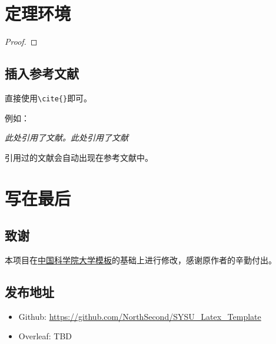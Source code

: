 \documentclass{SYSUReport}
\begin{document}
\section{定理环境}
\begin{Theorem}
\end{Theorem}

\begin{Lemma}
\end{Lemma}

\begin{Corollary}
\end{Corollary}

\begin{Proposition}
\end{Proposition}

\begin{Definition}
\end{Definition}

\begin{Example}
\end{Example}

\begin{proof}
\end{proof}

\subsection{插入参考文献}
直接使用\verb|\cite{}|即可。

例如：


\textit{ 此处引用了文献\cite{0Isaac}。此处引用了文献\cite{2016The}}


引用过的文献会自动出现在参考文献中。

\section{写在最后}

\subsection{致谢}

本项目在\href{https://github.com/jweihe/UCAS_Latex_Template}{中国科学院大学模板}的基础上进行修改，感谢原作者的辛勤付出。

\subsection{发布地址}
\begin{itemize}
    \item Github: \url{https://github.com/NorthSecond/SYSU_Latex_Template}
    \item Overleaf: TBD
\end{itemize}


\newpage


\end{document}
